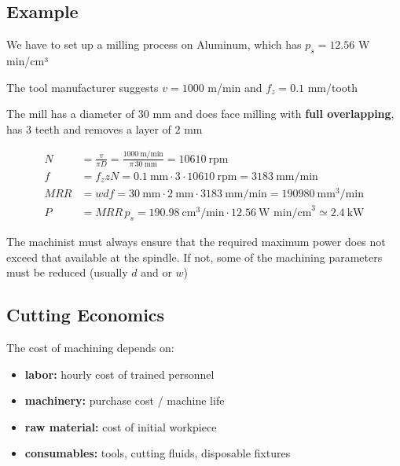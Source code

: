 \documentclass[
  letterpaper,
  DIV=11,
  numbers=noendperiod]{scrartcl}
\providecommand{\tightlist}{%
  \setlength{\itemsep}{0pt}\setlength{\parskip}{0pt}}
\begin{document}
\subsection{Example}\label{example}

We have to set up a milling process on Aluminum, which has
\(p_s = 12.56\) W min/cm³

The tool manufacturer suggests \(v = 1000\) m/min and \(f_z = 0.1\)
mm/tooth

The mill has a diameter of \(30\) mm and does face milling with
\textbf{full overlapping}, has \(3\) teeth and removes a layer of \(2\)
mm

\[
\begin{aligned}
N &= \frac{v}{\pi D} = \frac{1000\ \text{m/min}}{\pi\, 30\ \text{mm}} = 10610\ \text{rpm} \\
f &= f_z z N = 0.1\ \text{mm} \cdot 3 \cdot 10610\ \text{rpm} = 3183\ \text{mm/min} \\
MRR &= w d f = 30\ \text{mm} \cdot 2\ \text{mm} \cdot 3183\ \text{mm/min} = 190980\ \text{mm}^3/\text{min} \\
P &= MRR\, p_s = 190.98\ \text{cm}^3/\text{min} \cdot 12.56\ \text{W min/cm}^3 \simeq 2.4\ \text{kW}
\end{aligned}
\]

\begin{tcolorbox}[enhanced jigsaw, arc=.35mm, bottomrule=.15mm, bottomtitle=1mm, breakable, colback=white, colbacktitle=quarto-callout-note-color!10!white, colframe=quarto-callout-note-color-frame, coltitle=black, left=2mm, leftrule=.75mm, opacityback=0, opacitybacktitle=0.6, rightrule=.15mm, title=\textcolor{quarto-callout-note-color}{\faInfo}\hspace{0.5em}{Note}, titlerule=0mm, toprule=.15mm, toptitle=1mm]

The machinist must always ensure that the required maximum power does
not exceed that available at the spindle. If not, some of the machining
parameters must be reduced (usually \(d\) and or \(w\))

\end{tcolorbox}

\subsection{Cutting Economics}\label{cutting-economics}

The cost of machining depends on:

\begin{itemize}
\tightlist
\item
  \textbf{labor:} hourly cost of trained personnel
\item
  \textbf{machinery:} purchase cost / machine life
\item
  \textbf{raw material:} cost of initial workpiece
\item
  \textbf{consumables:} tools, cutting fluids, disposable fixtures
\end{itemize}
\end{document}
